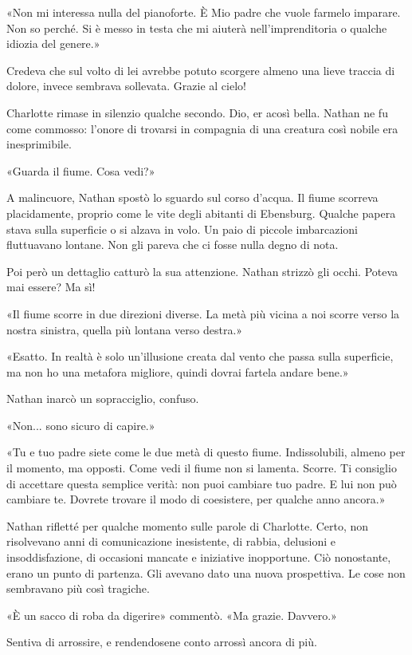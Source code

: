 \documentclass[a4paper,oneside,11pt]{memoir}
\begin{document}
«Non mi interessa nulla del pianoforte. È Mio padre che vuole farmelo imparare. Non so perché. Si è messo in testa che
mi aiuterà nell'imprenditoria o qualche idiozia del genere.»

Credeva che sul volto di lei avrebbe potuto scorgere almeno una lieve traccia di dolore, invece sembrava sollevata.
Grazie al cielo!

Charlotte rimase in silenzio qualche secondo. Dio, er acosì bella. Nathan ne fu come commosso: l'onore di trovarsi in
compagnia di una creatura così nobile era inesprimibile.

«Guarda il fiume. Cosa vedi?»

A malincuore, Nathan spostò lo sguardo sul corso d'acqua. Il fiume scorreva placidamente, proprio come le vite degli
abitanti di Ebensburg. Qualche papera stava sulla superficie o si alzava in volo. Un paio di piccole imbarcazioni
fluttuavano lontane. Non gli pareva che ci fosse nulla degno di nota.

Poi però un dettaglio catturò la sua attenzione. Nathan strizzò gli occhi. Poteva mai essere? Ma sì!

«Il fiume scorre in due direzioni diverse. La metà più vicina a noi scorre verso la nostra sinistra, quella più lontana
verso destra.»

«Esatto. In realtà è solo un'illusione creata dal vento che passa sulla superficie, ma non ho una metafora migliore,
quindi dovrai fartela andare bene.»

Nathan inarcò un sopracciglio, confuso.

«Non... sono sicuro di capire.»

«Tu e tuo padre siete come le due metà di questo fiume. Indissolubili, almeno per il momento, ma opposti. Come vedi il
fiume non si lamenta. Scorre. Ti consiglio di accettare questa semplice verità: non puoi cambiare tuo padre. E lui non
può cambiare te. Dovrete trovare il modo di coesistere, per qualche anno ancora.»

Nathan rifletté per qualche momento sulle parole di Charlotte. Certo, non risolvevano anni di comunicazione inesistente,
di rabbia, delusioni e insoddisfazione, di occasioni mancate e iniziative inopportune. Ciò nonostante, erano un punto di
partenza. Gli avevano dato una nuova prospettiva. Le cose non sembravano più così tragiche.

«È un sacco di roba da digerire» commentò. «Ma grazie. Davvero.»

Sentiva di arrossire, e rendendosene conto arrossì ancora di più.
\end{document}
